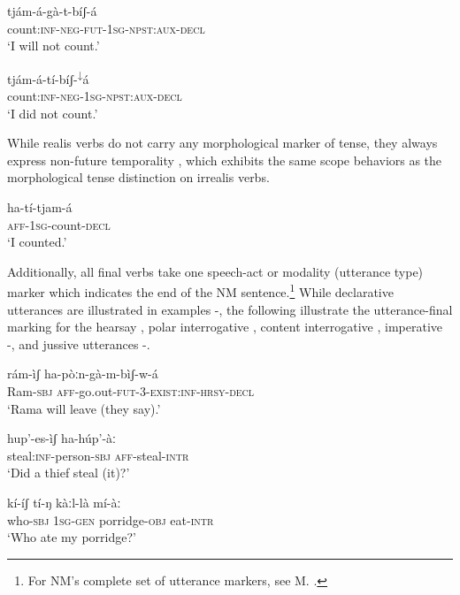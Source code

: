 \documentclass[output=paper]{langsci/langscibook}
\begin{document}
\ea\label{ex:mahland:6}
\gll tj\'{a}m-\'{a}-g\`{a}-t-b\'{i}ʃ-\'{a}   \\
count:\textsc{inf-neg-fut-1sg-npst:aux-decl} \\
\glt `I will not count.'
\z

\ea\label{ex:mahland:7}
\gll tj\'{a}m-\'{a}-t\'{i}-b\'{i}ʃ-\textsuperscript{↓}\'{a}\\
count:\textsc{inf-neg-1sg-npst:aux-decl} \\
\glt `I did not count.'
\z

While realis verbs do not carry any morphological marker of tense, they always express non-future temporality , which exhibits the same scope behaviors as the morphological tense distinction on irrealis verbs. 

\ea\label{ex:mahland:8}
\gll ha-t\'{i}-tjam-\'{a}\\
\textsc{aff-1sg}{}-count-\textsc{decl }\\
\glt `I counted.'
\z

Additionally, all final verbs take one speech-act or modality (utterance type) marker which indicates the end of the NM sentence.\footnote{For NM's complete set of utterance markers, see M. \citet[469]{Ahland2012}.} While declarative utterances are illustrated in examples -, the following illustrate the utterance-final marking for the hearsay , polar interrogative , content interrogative , imperative -, and jussive utterances -. 

\ea\label{ex:mahland:9}
\gll r\'{a}m-\`{i}ʃ  ha-p\`{o}ːn-g\`{a}-m-b\`{i}ʃ-w-\'{a}        \\
Ram-\textsc{sbj} \textsc{aff}{}-go.out-\textsc{fut-3-exist:inf-hrsy-decl} \\
\glt `Rama will leave (they say).'
\z 

\ea\label{ex:mahland:10}
\gll hup'-es-\`{i}ʃ                 ha-h\'{u}p'-\`{a}ː     \\
steal:\textsc{inf}{}-person-\textsc{sbj   aff}{}-steal-\textsc{intr}\\
\glt `Did a thief steal (it)?'
\z

\ea\label{ex:mahland:11}
\gll k\'{i}-\'{i}ʃ           t\'{i}-ŋ          k\`{a}ːl-l\`{a}            m\'{i}-\`{a}ː   \\
who-\textsc{sbj}   1\textsc{sg-gen}   porridge-\textsc{obj} eat-\textsc{intr}\\
\glt `Who ate my porridge?'
\z
\end{document}
